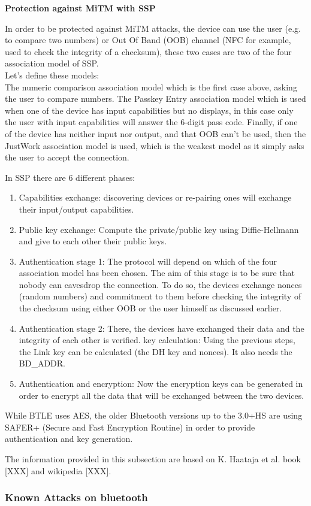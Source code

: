 \textbf{Protection against MiTM with SSP}

In order to be protected against MiTM attacks, the device can use the user (e.g. to compare two numbers) or Out Of Band (OOB) channel (NFC for example, used to check the integrity of a checksum), these two cases are two of the four association model of SSP. \\ 
Let's define these models:\\
The numeric comparison association model which is the first case above, asking the user to compare numbers. The Passkey Entry association model which is used when one of the device has input capabilities but no displays, in this case only the user with input capabilities will answer the 6-digit pass code.
Finally, if one of the device has neither input nor output, and that OOB can't be used, then the JustWork association model is used, which is the weakest model as it simply asks the user to accept the connection. 

In SSP there are 6 different phases:
\begin{enumerate}
	\item Capabilities exchange: discovering devices or re-pairing ones will exchange their input/output capabilities.
	\item Public key exchange: Compute the private/public key using Diffie-Hellmann and give to each other their public keys. 
	\item Authentication stage 1: The protocol will depend on which of the four association model has been chosen. The aim of this stage is to be sure that nobody can eavesdrop the connection. To do so, the devices exchange nonces (random numbers) and commitment to them before checking the integrity of the checksum using either OOB or the user himself as discussed earlier. 	
	\item Authentication stage 2: There, the devices have exchanged their data and the integrity of each other is verified.
	\itemLink key calculation: Using the previous steps, the Link key can be calculated (the DH key and nonces). It also needs the BD\_ADDR.
	\item Authentication and encryption: Now the encryption keys can be generated in order to encrypt all the data that will be exchanged between the two devices. 
\end{enumerate}
 
While BTLE uses AES, the older Bluetooth versions up to the 3.0+HS are using SAFER+ (Secure and Fast Encryption Routine) in order to provide authentication and key generation.

The information provided in this subsection are based on K. Haataja et al. book [XXX] and wikipedia [XXX].

\subsubsection{Known Attacks on bluetooth}















